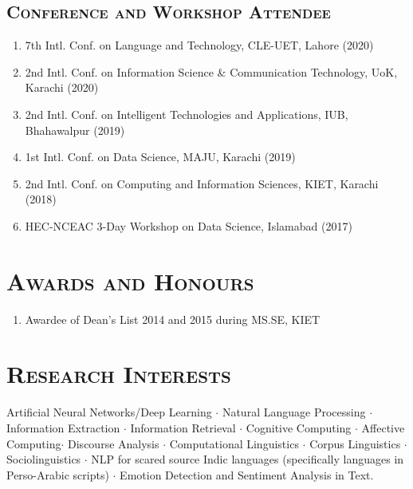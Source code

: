 \documentclass[a4paper, 10pt]{article}
\begin{document}
\subsection*{\normalfont\textsc{Conference and Workshop Attendee}}
\begin{enumerate}
\itemsep-4pt
\item 7th Intl. Conf. on Language and Technology, CLE-UET, Lahore (2020)
\item 2nd Intl. Conf. on Information Science \& Communication Technology, UoK, Karachi (2020)
\item 2nd Intl. Conf. on Intelligent Technologies and Applications, IUB, Bhahawalpur (2019)
\item 1st Intl. Conf. on Data Science, MAJU, Karachi (2019)
\item 2nd Intl. Conf. on Computing and Information Sciences, KIET, Karachi (2018)
\item HEC-NCEAC 3-Day Workshop on Data Science, Islamabad (2017) 
\end{enumerate}

\section*{\normalfont\textsc{Awards and Honours}}
\begin{enumerate}
\itemsep-4pt 
 \item Awardee of Dean's List 2014 and 2015 during MS.SE, KIET
\end{enumerate}

\section*{\normalfont\textsc{Research Interests}}
Artificial Neural Networks/Deep Learning $\cdot$ Natural Language Processing $\cdot$ Information Extraction $\cdot$ Information Retrieval $\cdot$ Cognitive Computing $\cdot$ Affective Computing$\cdot$ Discourse Analysis $\cdot$ Computational Linguistics $\cdot$  Corpus Linguistics $\cdot$ Sociolinguistics $\cdot$ NLP for scared source Indic languages (specifically languages in Perso-Arabic scripts) $\cdot$ Emotion Detection and Sentiment Analysis in Text.
\end{document}
